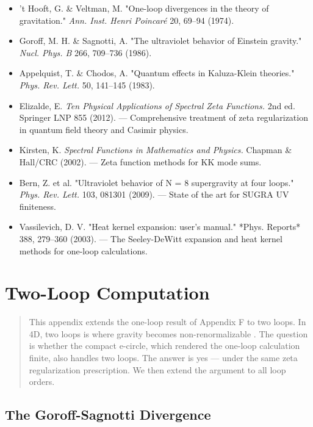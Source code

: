 \documentclass[aps,prd,preprint,superscriptaddress,longbibliography,floatfix]{revtex4-2}
\theoremstyle{remark}
\begin{document}
\begin{itemize}
  \item 't Hooft, G. \& Veltman, M. "One-loop divergences in the theory of gravitation." \textit{Ann. Inst. Henri Poincar\'{e}} 20, 69--94 (1974).
  \item Goroff, M. H. \& Sagnotti, A. "The ultraviolet behavior of Einstein gravity." \textit{Nucl. Phys. B} 266, 709--736 (1986).
  \item Appelquist, T. \& Chodos, A. "Quantum effects in Kaluza-Klein theories." \textit{Phys. Rev. Lett.} 50, 141--145 (1983).
  \item Elizalde, E. \textit{Ten Physical Applications of Spectral Zeta Functions.} 2nd ed. Springer LNP 855 (2012). --- Comprehensive treatment of zeta regularization in quantum field theory and Casimir physics.
  \item Kirsten, K. \textit{Spectral Functions in Mathematics and Physics.} Chapman \& Hall/CRC (2002). --- Zeta function methods for KK mode sums.
  \item Bern, Z. et al. "Ultraviolet behavior of N = 8 supergravity at four loops." \textit{Phys. Rev. Lett.} 103, 081301 (2009). --- State of the art for SUGRA UV finiteness.
  \item Vassilevich, D. V. "Heat kernel expansion: user's manual." *Phys. Reports* 388, 279--360 (2003). --- The Seeley-DeWitt expansion and heat kernel methods for one-loop calculations.
\end{itemize}


\section{Two-Loop Computation}


\begin{quote}
This appendix extends the one-loop result of Appendix F to two loops.
In 4D, two loops is where gravity becomes non-renormalizable \cite{GoroffSagnotti1986}. The question is whether the compact e-circle, which
rendered the one-loop calculation finite, also handles two loops. The
answer is yes --- under the same zeta regularization prescription. We then
extend the argument to all loop orders.
\end{quote}



\subsection{The Goroff-Sagnotti Divergence}
\end{document}
